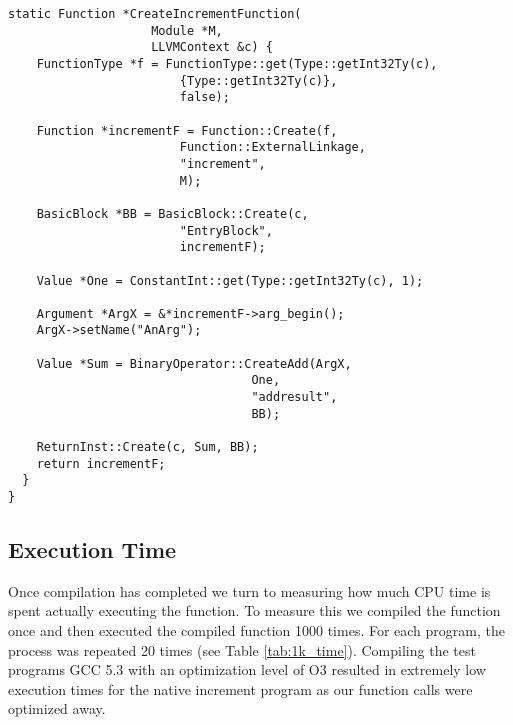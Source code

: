 \begin{lstlisting}[float,floatplacement=H,
  caption={Generating MCJIT IR for the increment program.},
  label=lst:llvm_increment]
  static Function *CreateIncrementFunction(
                    Module *M, 
                    LLVMContext &c) {
    FunctionType *f = FunctionType::get(Type::getInt32Ty(c), 
                        {Type::getInt32Ty(c)}, 
                        false);
    
    Function *incrementF = Function::Create(f, 
                        Function::ExternalLinkage, 
                        "increment", 
                        M);

    BasicBlock *BB = BasicBlock::Create(c, 
                        "EntryBlock", 
                        incrementF);
    
    Value *One = ConstantInt::get(Type::getInt32Ty(c), 1);
    
    Argument *ArgX = &*incrementF->arg_begin(); 
    ArgX->setName("AnArg");
  
    Value *Sum = BinaryOperator::CreateAdd(ArgX, 
                                  One,
                                  "addresult", 
                                  BB);
  
    ReturnInst::Create(c, Sum, BB);
    return incrementF;
  }
}\end{lstlisting}

\subsection{Execution Time}
Once compilation has completed we turn to measuring how much CPU time is spent actually executing the function.
To measure this we compiled the function once and then executed the compiled function 1000 times.
For each program, the process was repeated 20 times (see Table \ref{tab:1k_time}).
Compiling the test programs GCC 5.3 with an optimization level of O3 resulted in extremely low execution times for the native increment program as our function calls were optimized away.

